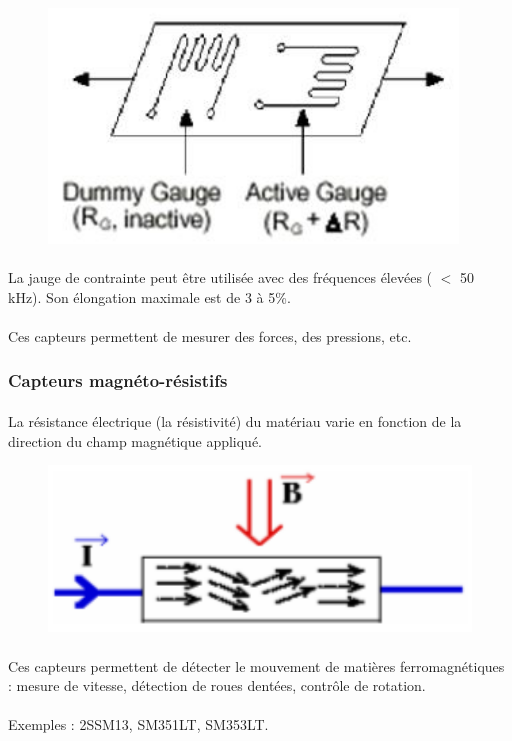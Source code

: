\documentclass{article}
\begin{document}
\begin{figure}[H]
    \centering
    \includegraphics[width=0.3\linewidth]{./images/jauge-contrainte.png}
\end{figure}

\paragraph{}
La jauge de contrainte peut être utilisée avec des fréquences élevées ( $<$ 50 \si{\kilo\hertz}). Son élongation maximale est de 3 à 5\%.

\paragraph{}
Ces capteurs permettent de mesurer des forces, des pressions, etc.

\subsubsection{Capteurs magnéto-résistifs}
\paragraph{}
La résistance électrique (la résistivité) du matériau varie en fonction de la direction du champ magnétique appliqué.

\begin{figure}[H]
    \centering
    \includegraphics[width=0.3\linewidth]{./images/magnetoresistif.png}
\end{figure}

\paragraph{}
Ces capteurs permettent de détecter le mouvement de matières ferromagnétiques : mesure de vitesse, détection de roues dentées, contrôle de rotation.

\paragraph{}
Exemples : 2SSM13, SM351LT, SM353LT.
\end{document}
